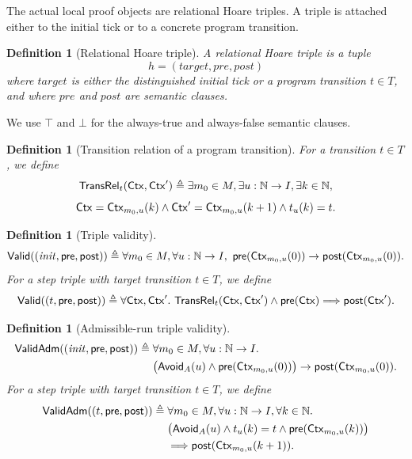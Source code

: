 \documentclass[acmsmall,screen]{acmart}
\theoremstyle{leftplain}
\theoremstyle{leftdefinition}
\newtheorem{definition}[theorem]{Definition}
\theoremstyle{leftremark}
\begin{document}
The actual local proof objects are relational Hoare triples. A triple is
attached either to the initial tick or to a concrete program transition.

\begin{definition}[Relational Hoare triple]
A relational Hoare triple is a tuple
\[
  h = (\mathit{target}, \mathit{pre}, \mathit{post})
\]
where $\mathit{target}$ is either the distinguished initial tick or a program
transition $t \in T$, and where $\mathit{pre}$ and $\mathit{post}$ are
semantic clauses.
\end{definition}

We use $\top$ and $\bot$ for the always-true and always-false semantic
clauses.

\begin{definition}[Transition relation of a program transition]
For a transition $t \in T$, we define
\[
  \mathsf{TransRel}_t(\mathsf{Ctx},\mathsf{Ctx}') \triangleq
  \exists m_0 \in M,\exists u : \mathbb{N} \to I,\exists k \in \mathbb{N},
\]
\[
  \mathsf{Ctx} = \mathsf{Ctx}_{m_0,u}(k)
  \wedge
  \mathsf{Ctx}' = \mathsf{Ctx}_{m_0,u}(k+1)
  \wedge
  t_u(k) = t.
\]
\end{definition}

\begin{definition}[Triple validity]
\[
  \mathsf{Valid}((\mathit{init},\mathsf{pre},\mathsf{post}))
  \triangleq
  \forall m_0 \in M,\forall u : \mathbb{N} \to I,\
  \mathsf{pre}(\mathsf{Ctx}_{m_0,u}(0)) \rightarrow \mathsf{post}(\mathsf{Ctx}_{m_0,u}(0)).
\]
For a step triple with target transition $t \in T$, we define
\[
  \mathsf{Valid}((t,\mathsf{pre},\mathsf{post}))
  \triangleq
  \forall \mathsf{Ctx},\mathsf{Ctx}'.\
  \mathsf{TransRel}_t(\mathsf{Ctx},\mathsf{Ctx}') \wedge \mathsf{pre}(\mathsf{Ctx})
  \Longrightarrow \mathsf{post}(\mathsf{Ctx}').
\]
\end{definition}

\begin{definition}[Admissible-run triple validity]
\[
  \begin{aligned}
    \mathsf{ValidAdm}((\mathit{init},\mathsf{pre},\mathsf{post}))
    \triangleq{}& \forall m_0 \in M,\forall u : \mathbb{N} \to I.\\
    &\bigl(\mathsf{Avoid}_A(u) \wedge \mathsf{pre}(\mathsf{Ctx}_{m_0,u}(0))\bigr)
      \rightarrow \mathsf{post}(\mathsf{Ctx}_{m_0,u}(0)).
  \end{aligned}
\]
For a step triple with target transition $t \in T$, we define
\[
  \begin{aligned}
    \mathsf{ValidAdm}((t,\mathsf{pre},\mathsf{post}))
    \triangleq{}& \forall m_0 \in M,\forall u : \mathbb{N} \to I,\forall k \in \mathbb{N}.\\
    &\bigl(\mathsf{Avoid}_A(u) \wedge t_u(k)=t \wedge \mathsf{pre}(\mathsf{Ctx}_{m_0,u}(k))\bigr)\\
    &\Longrightarrow \mathsf{post}(\mathsf{Ctx}_{m_0,u}(k+1)).
  \end{aligned}
\]
\end{definition}
\end{document}
